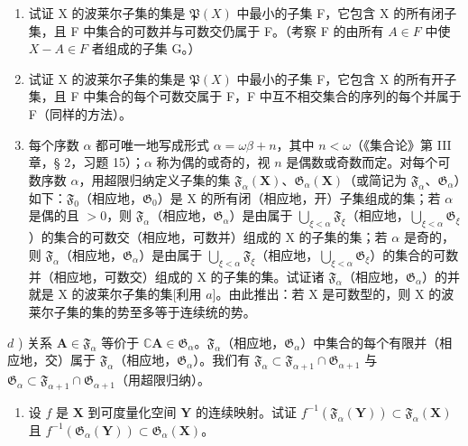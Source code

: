 \begin{enumerate}
\def\labelenumi{\alph{enumi})}
\item
  试证 X 的波莱尔子集的集是 \(\mathfrak{P}(X)\) 中最小的子集 F，它包含 X 的所有闭子集，且 F 中集合的可数并与可数交仍属于 F。（考察 F 的由所有 \(A \in F\) 中使 \(X - A \in F\) 者组成的子集 G。）
\item
  试证 X 的波莱尔子集的集是 \(\mathfrak{P}(X)\) 中最小的子集 F，它包含 X 的所有开子集，且 F 中集合的每个可数交属于 F，F 中互不相交集合的序列的每个并属于 F（同样的方法）。
\item
  每个序数 \(\alpha\) 都可唯一地写成形式 \(\alpha = \omega\beta + n\)，其中 \(n < \omega\)（《集合论》第 III 章，§ 2，习题 15）；\(\alpha\) 称为偶的或奇的，视 \(n\) 是偶数或奇数而定。对每个可数序数 \(\alpha\)，用超限归纳定义子集的集 \(\mathfrak{F}_{\alpha}(\mathbf{X})\)、\(\mathfrak{G}_{\alpha}(\mathbf{X})\)（或简记为 \(\mathfrak{F}_{\alpha}\)、\(\mathfrak{G}_{\alpha}\)）如下：\(\mathfrak{F}_0\)（相应地，\(\mathfrak{G}_0\)）是 X 的所有闭（相应地，开）子集组成的集；若 \(\alpha\) 是偶的且 \(>0\)，则 \(\mathfrak{F}_{\alpha}\)（相应地，\(\mathfrak{G}_{\alpha}\)）是由属于 \(\bigcup_{\xi < \alpha} \mathfrak{F}_{\xi}\)（相应地，\(\bigcup_{\xi < \alpha} \mathfrak{G}_{\xi}\)）的集合的可数交（相应地，可数并）组成的 X 的子集的集；若 \(\alpha\) 是奇的，则 \(\mathfrak{F}_{\alpha}\)（相应地，\(\mathfrak{G}_{\alpha}\)）是由属于 \(\bigcup_{\xi < \alpha} \mathfrak{F}_{\xi}\)（相应地，\(\bigcup_{\xi < \alpha} \mathfrak{G}_{\xi}\)）的集合的可数并（相应地，可数交）组成的 X 的子集的集。试证诸 \(\mathfrak{F}_{\alpha}\)（相应地，\(\mathfrak{G}_{\alpha}\)）的并就是 X 的波莱尔子集的集{[}利用 \(a\){]}。由此推出：若 X 是可数型的，则 X 的波莱尔子集的集的势至多等于连续统的势。
\end{enumerate}

\(d\) ) 关系 \(\mathbf{A}\in\mathfrak{F}_{\alpha}\) 等价于 \(\mathbb{C}\mathbf{A}\in\mathfrak{G}_{\alpha}\)。\(\mathfrak{F}_{\alpha}\)（相应地，\(\mathfrak{G}_{\alpha}\)）中集合的每个有限并（相应地，交）属于 \(\mathfrak{F}_{\alpha}\)（相应地，\(\mathfrak{G}_{\alpha}\)）。我们有 \(\mathfrak{F}_{\alpha}\subset\mathfrak{F}_{\alpha+1}\cap\mathfrak{G}_{\alpha+1}\) 与 \(\mathfrak{G}_{\alpha}\subset\mathfrak{F}_{\alpha+1}\cap\mathfrak{G}_{\alpha+1}\)（用超限归纳）。

\begin{enumerate}
\def\labelenumi{\alph{enumi})}
\setcounter{enumi}{4}
\tightlist
\item
  设 \(f\) 是 \(\mathbf{X}\) 到可度量化空间 \(\mathbf{Y}\) 的连续映射。试证 \(f^{-1}(\mathfrak{F}_{\alpha}(\mathbf{Y})) \subset \mathfrak{F}_{\alpha}(\mathbf{X})\) 且 \(f^{-1}(\mathfrak{G}_{\alpha}(\mathbf{Y})) \subset \mathfrak{G}_{\alpha}(\mathbf{X})\)。
\end{enumerate}

